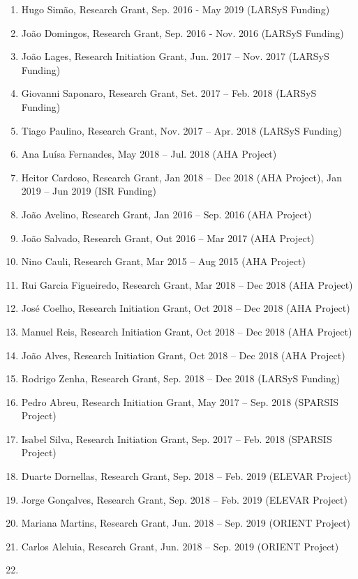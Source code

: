 \begin{enumerate}
  Project)
\item
  Hugo Simão, Research Grant, Sep. 2016 - May 2019 (LARSyS Funding)
\item
  João Domingos, Research Grant, Sep. 2016 - Nov. 2016 (LARSyS Funding)
\item
  João Lages, Research Initiation Grant, Jun. 2017 -- Nov. 2017 (LARSyS
  Funding)
\item
  Giovanni Saponaro, Research Grant, Set. 2017 -- Feb. 2018 (LARSyS
  Funding)
\item
  Tiago Paulino, Research Grant, Nov. 2017 -- Apr. 2018 (LARSyS Funding)
\item
  Ana Luísa Fernandes, May 2018 -- Jul. 2018 (AHA Project)
\item
  Heitor Cardoso, Research Grant, Jan 2018 -- Dec 2018 (AHA Project),
  Jan 2019 -- Jun 2019 (ISR Funding)
\item
  João Avelino, Research Grant, Jan 2016 -- Sep. 2016 (AHA Project)
\item
  João Salvado, Research Grant, Out 2016 -- Mar 2017 (AHA Project)
\item
  Nino Cauli, Research Grant, Mar 2015 -- Aug 2015 (AHA Project)
\item
  Rui Garcia Figueiredo, Research Grant, Mar 2018 -- Dec 2018 (AHA
  Project)
\item
  José Coelho, Research Initiation Grant, Oct 2018 -- Dec 2018 (AHA
  Project)
\item
  Manuel Reis, Research Initiation Grant, Oct 2018 -- Dec 2018 (AHA
  Project)
\item
  João Alves, Research Initiation Grant, Oct 2018 -- Dec 2018 (AHA
  Project)
\item
  Rodrigo Zenha, Research Grant, Sep. 2018 -- Dec 2018 (LARSyS Funding)
\item
  Pedro Abreu, Research Initiation Grant, May 2017 -- Sep. 2018 (SPARSIS
  Project)
\item
  Isabel Silva, Research Initiation Grant, Sep. 2017 -- Feb. 2018
  (SPARSIS Project)
\item
  Duarte Dornellas, Research Grant, Sep. 2018 -- Feb. 2019 (ELEVAR
  Project)
\item
  Jorge Gonçalves, Research Grant, Sep. 2018 -- Feb. 2019 (ELEVAR
  Project)
\item
  Mariana Martins, Research Grant, Jun. 2018 -- Sep. 2019 (ORIENT
  Project)
\item
  Carlos Aleluia, Research Grant, Jun. 2018 -- Sep. 2019 (ORIENT
  Project)
\item

\end{enumerate}
